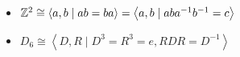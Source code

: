 \begin{eg}
	 \begin{itemize}
		\item $\mathbb{Z}^2 \cong \left< a,b \mid a b = b a \right> = \left< a,b \mid a b a^{-1} b^{-1} = c \right>$
		\item $D_{6} \cong \left< D,R \mid D^3 = R^3 = e, R D R = D^{-1} \right>$
	\end{itemize}
\end{eg}





























